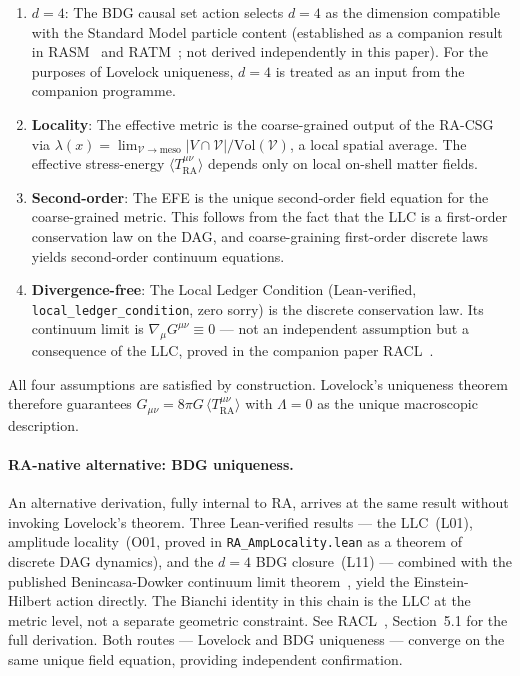 \documentclass[11pt,a4paper]{article}
\theoremstyle{plain}
\theoremstyle{definition}
\theoremstyle{remark}
\newcommand{\Tact}{T^{\mu\nu}_{\mathrm{RA}}}
\begin{document}
\begin{enumerate}[noitemsep,label=(\roman*)]
  \item \textbf{$d=4$}: The BDG causal set action selects $d=4$ as the
  dimension compatible with the Standard Model particle content
  (established as a companion result in RASM~\citep{Sandeman2026RASM} and
  RATM~\citep{Sandeman2026RATM}; not derived independently in this paper).
  For the purposes of Lovelock uniqueness, $d=4$ is treated as an input
  from the companion programme.
  \item \textbf{Locality}: The effective metric is the coarse-grained output of
  the RA-CSG via $\lambda(x) = \lim_{\mathcal{V}\to\mathrm{meso}}|V \cap \mathcal{V}|/
  \mathrm{Vol}(\mathcal{V})$, a local spatial average. The effective stress-energy
  $\langle\Tact\rangle$ depends only on local on-shell matter fields.
  \item \textbf{Second-order}: The EFE is the unique second-order field equation
  for the coarse-grained metric. This follows from the fact that the LLC is a
  first-order conservation law on the DAG, and coarse-graining first-order
  discrete laws yields second-order continuum equations.
  \item \textbf{Divergence-free}: The Local Ledger Condition (Lean-verified,
  \texttt{local\_ledger\_condition}, zero sorry) is the discrete conservation
  law. Its continuum limit is $\nabla_\mu G^{\mu\nu} \equiv 0$ --- not an
  independent assumption but a consequence of the LLC, proved in the companion
  paper RACL~\citep{Sandeman2026RACL}.
\end{enumerate}

All four assumptions are satisfied by construction. Lovelock's uniqueness
theorem therefore guarantees $G_{\mu\nu} = 8\pi G\,\langle\Tact\rangle$
with $\Lambda = 0$ as the unique macroscopic description.

\paragraph{RA-native alternative: BDG uniqueness.}
An alternative derivation, fully internal to RA, arrives at the same
result without invoking Lovelock's theorem. Three Lean-verified results
--- the LLC~(L01), amplitude locality~(O01, proved in
\texttt{RA\_AmpLocality.lean} as a theorem of discrete DAG dynamics),
and the $d=4$ BDG closure~(L11) --- combined with the published
Benincasa-Dowker continuum limit theorem~\citep{Benincasa2010},
yield the Einstein-Hilbert action directly. The Bianchi identity in
this chain is the LLC at the metric level, not a separate geometric
constraint. See RACL~\citep{Sandeman2026RACL}, Section~5.1 for the
full derivation. Both routes --- Lovelock and BDG uniqueness ---
converge on the same unique field equation, providing independent
confirmation.
\end{document}
